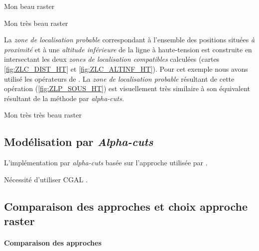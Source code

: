 \begin{carte}
  \centering
  
  \caption{Mon beau raster}
  \label{fig:ZLC_DIST_HT}
\end{carte}


\begin{carte}
  \centering
  
  \caption{Mon très beau raster}
  \label{fig:ZLC_ALTINF_HT}
\end{carte}

La \emph{zone de localisation probable} correspondant à l'ensemble des
positions situées \emph{à proximité} et à une \emph{altitude
  inférieure} de la ligne à haute-tension est construite en
intersectant les deux \emph{zones de localisation compatibles}
calculées (cartes \ref{fig:ZLC_DIST_HT} et
\ref{fig:ZLC_ALTINF_HT}). Pour cet exemple nous avons utilisé les
opérateurs de \textcite{Zadeh1965}.
% 
La \emph{zone de localisation probable} résultant de cette opération
(\ref{fig:ZLP_SOUS_HT}) est visuellement très similaire à son
équivalent résultant de la méthode par \emph{alpha-cuts.}

\begin{carte}
  \centering
  
  \caption{Mon très très beau raster}
  \label{fig:ZLP_SOUS_HT}
\end{carte}


\subsection{Modélisation par \emph{Alpha-cuts}}

L'implémentation par \emph{alpha-cuts} basée sur l'approche utilisée
par \textcite{Runz2008a,Zoghlami2016}.



Nécessité d'utiliser CGAL \autocite{CGAL2019}.




\subsection{Comparaison des approches et choix approche raster}

\paragraph{Comparaison des approches}


